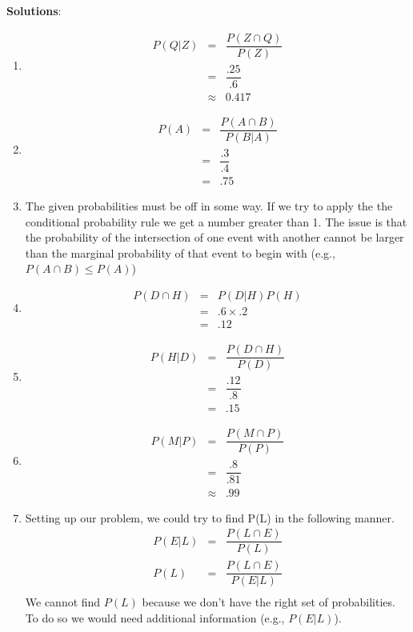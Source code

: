 \documentclass[10pt]{amsart}
\begin{document}
\textbf{Solutions}:\\
\begin{enumerate}
\item
\begin{eqnarray*}
P(Q|Z) &=& \dfrac{P(Z \cap Q)}{P(Z)}\\
&=& \dfrac{.25}{.6}\\
&\approx& 0.417
\end{eqnarray*}

\item
\begin{eqnarray*}
P(A) &=& \dfrac{P(A \cap B)}{P(B|A)}\\
&=& \dfrac{.3}{.4}\\
&=& .75
\end{eqnarray*}

\item
The given probabilities must be off in some way. If we try to apply the the conditional probability rule we get a number greater than 1. The issue is that the probability of the intersection of one event with another cannot be larger than the marginal probability of that event to begin with (e.g., $P(A \cap B) \le P(A)$)

\item
\begin{eqnarray*}
P(D \cap H) &=& P(D|H) P(H)\\
&=&.6 \times .2\\
&=& .12
\end{eqnarray*}

\item
\begin{eqnarray*}
P(H | D) &=& \dfrac{P(D \cap H)}{P(D)}\\
&=& \dfrac{.12}{.8}\\
&=& .15
\end{eqnarray*}

\item
\begin{eqnarray*}
P(M | P) &=& \dfrac{P(M \cap P)}{P(P)}\\
&=& \dfrac{.8}{.81}\\
&\approx& .99
\end{eqnarray*}

\item
Setting up our problem, we could try to find P(L) in the following manner. 
\begin{eqnarray*}
P(E|L) &=& \dfrac{P(L \cap E)}{P(L)}\\
P(L) &=& \dfrac{ P( L \cap E) }{P(E|L) }\\
\end{eqnarray*}
We cannot find $P(L)$ because we don't have the right set of probabilities. To do so we would need additional information (e.g.,  $P(E | L)$). 

\end{enumerate}
\end{document}
